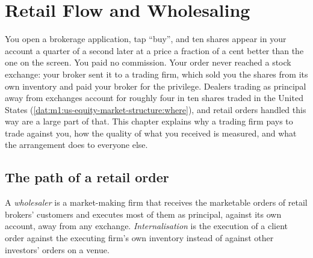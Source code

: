 \chapter{Retail Flow and Wholesaling}\label{ch:m1:retail-flow-and-wholesaling}

You open a brokerage application, tap ``buy'', and ten shares appear in your
account a quarter of a second later at a price a fraction of a cent better
than the one on the screen. You paid no commission. Your order never reached
a stock exchange: your broker sent it to a trading firm, which sold you the
shares from its own inventory and paid your broker for the privilege. Dealers
trading as principal away from exchanges account for roughly four in ten
shares traded in the United States
(\cref{dat:m1:us-equity-market-structure:where}), and retail orders handled
this way are a large part of that. This chapter explains why a
trading firm pays to trade against you, how the quality of what you received
is measured, and what the arrangement does to everyone else.

\section{The path of a retail order}

\begin{definition}\label{def:m1:retail-flow-and-wholesaling:wholesaler}
A \emph{wholesaler} is a market-making firm that receives
the marketable orders of retail brokers' customers and executes most of them
as principal, against its own account, away from any exchange.
\emph{Internalisation} is the execution of a client
order against the executing firm's own inventory instead of against other
investors' orders on a venue.
\end{definition}

